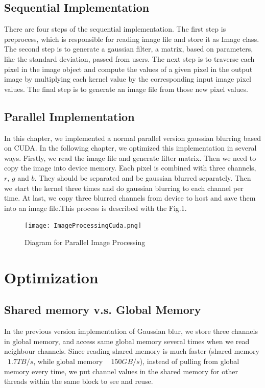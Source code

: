 \documentclass[journal,11pt,onecolumn,draftclsnofoot]{ieeeconf}  %
\begin{document}
\subsection{Sequential  Implementation}
There are four steps of the sequential implementation. The first step is preprocess, which is responsible for reading image file and store it as Image class. The second step is to generate a gaussian filter, a matrix, based on parameters, like the standard deviation,  passed from users. The next step is to traverse each pixel in the image object and compute the values of a given pixel in the output image by multiplying each kernel value by the corresponding input image pixel values. The final step is to generate an image file from those new pixel values.

\subsection{Parallel  Implementation}
In this chapter, we implemented a normal parallel version gaussian blurring based on CUDA. In the following chapter, we optimized this implementation in several ways.  Firstly, we read the image file and generate filter matrix. Then we need to copy the image into device memory. Each pixel is combined with three channels, $r$, $g$ and $b$.  They should be separated and be gaussian blurred separately. Then we start the kernel three times and do gaussian blurring to each channel per time.  At last, we copy three blurred channels from device to host and save them into an image file.This process is described with the Fig.1.

\begin{figure}[h]
	\centering\texttt{[image: ImageProcessingCuda.png]}
	\caption{Diagram for Parallel Image Processing}
	\label{parallel}
\end{figure}


\section{Optimization}

\subsection{Shared memory v.s. Global Memory}
In the previous version implementation of Gaussian blur, we store three channels in global memory, and access same global memory several times when we read neighbour channels. Since reading shared memory is much faster (shared memory ~$1.7TB/s$, while global memory ~ $150GB/s$), instead of pulling from global memory every time, we put channel values in the shared memory for other threads within the same block to see and reuse. 
\end{document}
